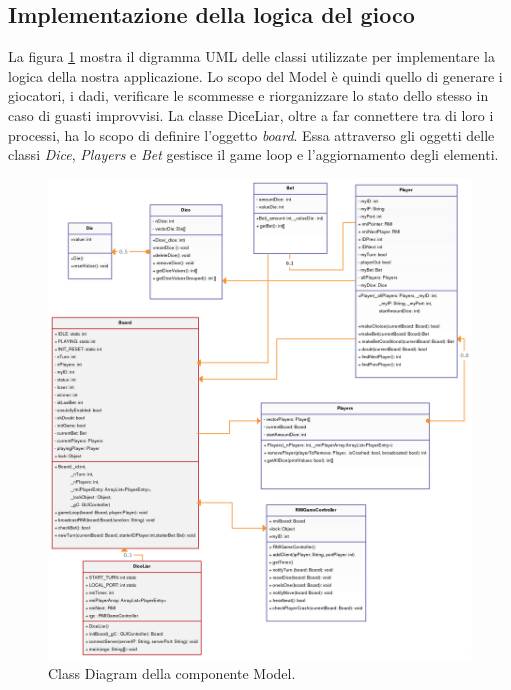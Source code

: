 \documentclass{llncs}
\begin{document}
		\subsection{Implementazione della logica del gioco}
			La figura \ref{Model} mostra il digramma UML delle classi utilizzate per implementare la logica della nostra applicazione. Lo scopo del Model è quindi quello di generare i giocatori, i dadi, verificare le scommesse e riorganizzare lo stato dello stesso in caso di guasti improvvisi. La classe DiceLiar, oltre a far connettere tra di loro i processi, ha lo scopo di definire l'oggetto \textit{board}. Essa attraverso gli oggetti delle classi \textit{Dice}, \textit{Players} e \textit{Bet} gestisce il game loop e l'aggiornamento degli elementi.
			\newpage
			\begin{figure}[H]
				\includegraphics[scale=0.35]{img/Model.png}
				\caption{\small{Class Diagram della componente Model.}}
				\label{Model}
			\end{figure}
			\newpage
\end{document}
